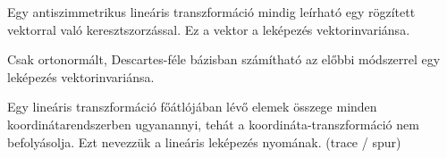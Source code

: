 \begin{definition}[Vektorinvariáns]
  Egy antiszimmetrikus lineáris transzformáció mindig leírható egy rögzített
  vektorral való keresztszorzással. Ez a vektor a leképezés vektorinvariánsa.
\end{definition}

\begin{note}
  Csak ortonormált, Descartes-féle bázisban számítható az előbbi módszerrel egy
  leképezés vektorinvariánsa.
\end{note}

\begin{definition}
  Egy lineáris transzformáció főátlójában lévő elemek összege minden
  koordinátarendszerben ugyanannyi, tehát a koordináta-transzformáció
  nem befolyásolja. Ezt nevezzük a lineáris leképezés nyomának. (trace / spur)
\end{definition}